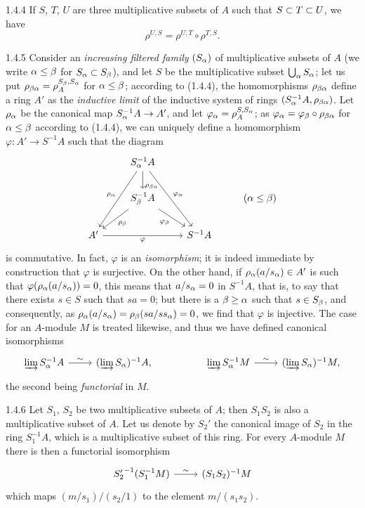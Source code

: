 \documentclass[../main.tex]{subfiles}
\begin{document}
\begin{cx}{1.4.4}
If $S$, $T$, $U$ are three multiplicative subsets of $A$ such that $S\subset T\subset U$, we have
\[
  \rho^{U,S}=\rho^{U,T}\circ\rho^{T,S}.
\]
\end{cx}

\begin{cx}{1.4.5}
Consider an \emph{increasing filtered family} $(S_\alpha)$ of multiplicative subsets of $A$
(we write $\alpha\leq\beta$ for $S_\alpha\subset S_\beta$), and let $S$ be the multiplicative subset
$\bigcup_\alpha S_\alpha$; let us put $\rho_{\beta\alpha}=\rho_A^{S_\beta,S_\alpha}$ for $\alpha\leq\beta$;
according to (1.4.4), the homomorphisms $\rho_{\beta\alpha}$ define a ring $A'$ as the \emph{inductive limit}
of the inductive system of rings $(S_\alpha^{-1}A,\rho_{\beta\alpha})$. Let $\rho_\alpha$ be the canonical
map $S_\alpha^{-1}A\to A'$, and let $\varphi_\alpha=\rho_A^{S,S_\alpha}$; as
$\varphi_\alpha=\varphi_\beta\circ\rho_{\beta\alpha}$ for $\alpha\leq\beta$ according to
(1.4.4), we can uniquely define a homomorphism $\varphi:A'\to S^{-1}A$ such that the diagram
\[\TI
  & S_\a^{-1}A\ar[ddl,"\rho_\a"']\ar[d,very near end,"\rho_{\b\a}"]\ar[rdd,"\varphi_\a"]\\
  & S_\b^{-1}A\ar[ld,"\rho_\b"]\ar[rd,"\varphi_\b"'] & & (\a\leq\b)\\
  A' \ar[rr,"\varphi"'] & & S^{-1}A
\TE\]
is commutative. In fact, $\varphi$ is an \emph{isomorphism}; it is indeed immediate by construction that
$\varphi$ is surjective. On the other hand, if $\rho_\alpha(a/s_\alpha)\in A'$ is such that
${\varphi(\rho_\alpha(a/s_\alpha))=0}$, this means that $a/s_\alpha=0$ in $S^{-1}A$, that is, to say that
there exists $s\in S$ such that $sa=0$; but there is a $\beta\geq\alpha$ such that $s\in S_\beta$, and
consequently, as $\rho_\alpha(a/s_\alpha)=\rho_\beta(sa/ss_\alpha)=0$, we find that $\varphi$ is injective.
The case for an $A$-module $M$ is treated likewise, and thus we have defined canonical isomorphisms
\[\TI
  \varinjlim S_\a^{-1}A\ar[r,"\sim"] & (\varinjlim S_\a)^{-1}A, & &
  \varinjlim S_\a^{-1}M\ar[r,"\sim"] & (\varinjlim S_\a)^{-1}M,
\TE\]
the second being \emph{functorial} in $M$.
\end{cx}

\begin{cx}{1.4.6}
Let $S_1$, $S_2$ be two multiplicative subsets of $A$; then $S_1 S_2$ is also a multiplicative subset
of $A$. Let us denote by $S_2'$ the canonical image of $S_2$ in the ring $S_1^{-1}A$, which is a multiplicative
subset of this ring. For every $A$-module $M$ there is then a functorial isomorphism
\[\TI
  {S_2'}^{-1}(S_1^{-1}M)\ar[r,"\sim"] & (S_1 S_2)^{-1}M
\TE\]
which maps $(m/s_1)/(s_2/1)$ to the element $m/(s_1 s_2)$.
\end{cx}
\end{document}
